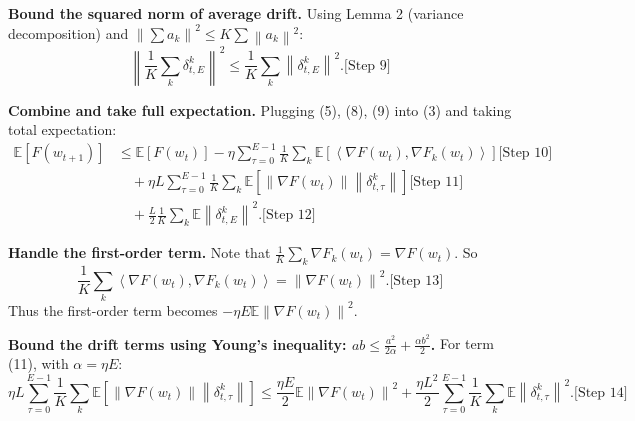 \documentclass{article}
\newcommand{\norm}[1]{\left\| #1 \right\|}
\newcommand{\inner}[2]{\left\langle #1, #2 \right\rangle}
\newcommand{\step}[1]{\text{[Step #1]}}
\begin{document}
\step{5} \textbf{Bound the squared norm of average drift.}
Using Lemma 2 (variance decomposition) and $\norm{\sum a_k}^2 \le K \sum \norm{a_k}^2$:
\begin{equation}
    \norm{\frac{1}{K}\sum_k \delta_{t,E}^k}^2 \le \frac{1}{K}\sum_k \norm{\delta_{t,E}^k}^2. \step{9}
\end{equation}

\step{6} \textbf{Combine and take full expectation.}
Plugging (5), (8), (9) into (3) and taking total expectation:
\begin{align}
\mathbb{E}[F(w_{t+1})] &\le \mathbb{E}[F(w_t)] - \eta \sum_{\tau=0}^{E-1} \frac{1}{K}\sum_k \mathbb{E}\left[ \inner{\nabla F(w_t)}{\nabla F_k(w_t)} \right] \step{10} \\
&\quad + \eta L \sum_{\tau=0}^{E-1} \frac{1}{K}\sum_k \mathbb{E}\left[ \norm{\nabla F(w_t)} \norm{\delta_{t,\tau}^k} \right] \step{11} \\
&\quad + \frac{L}{2} \frac{1}{K}\sum_k \mathbb{E}\norm{\delta_{t,E}^k}^2. \step{12}
\end{align}

\step{7} \textbf{Handle the first-order term.}
Note that $\frac{1}{K}\sum_k \nabla F_k(w_t) = \nabla F(w_t)$. So
\begin{equation}
    \frac{1}{K}\sum_k \inner{\nabla F(w_t)}{\nabla F_k(w_t)} = \norm{\nabla F(w_t)}^2. \step{13}
\end{equation}
Thus the first-order term becomes $-\eta E \mathbb{E}\norm{\nabla F(w_t)}^2$.

\step{8} \textbf{Bound the drift terms using Young's inequality: $ab \le \frac{a^2}{2\alpha} + \frac{\alpha b^2}{2}$.}
For term (11), with $\alpha = \eta E$:
\begin{equation}
    \eta L \sum_{\tau=0}^{E-1} \frac{1}{K}\sum_k \mathbb{E}\left[ \norm{\nabla F(w_t)} \norm{\delta_{t,\tau}^k} \right] \le \frac{\eta E}{2} \mathbb{E}\norm{\nabla F(w_t)}^2 + \frac{\eta L^2}{2} \sum_{\tau=0}^{E-1} \frac{1}{K}\sum_k \mathbb{E}\norm{\delta_{t,\tau}^k}^2. \step{14}
\end{equation}
\end{document}
